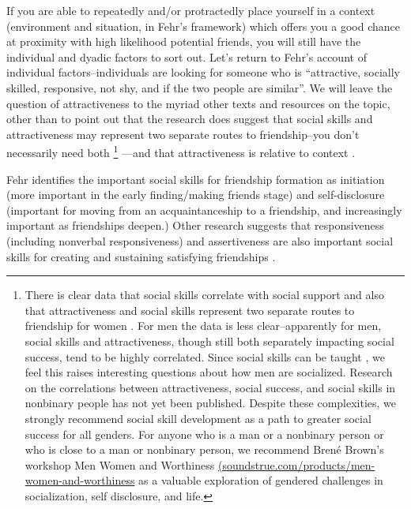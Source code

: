 \documentclass[12pt,letterpaper]{book}
\begin{document}
If you are able to repeatedly and/or protractedly place yourself in a context (environment and situation, in Fehr's framework) which offers you a good chance at proximity with high likelihood potential friends, you will still have the individual and dyadic factors to sort out. Let's return to Fehr's account of individual factors–individuals are looking for someone who is “attractive, socially skilled, responsive, not shy, and if the two people are similar”. We will leave the question of attractiveness to the myriad other texts and resources on the topic, other than to point out that the research does suggest that social skills and attractiveness may represent two separate routes to friendship–you don't necessarily need both \footnote{There is clear data that social skills correlate with social support \cite{sarason1985concomitants} and also that attractiveness and social skills represent two separate routes to friendship for women \cite{reis1982physical}. For men the data is less clear–apparently for men, social skills and attractiveness, though still both separately impacting social success, tend to be highly correlated. Since social skills can be taught \cite{brigman1999teaching,sazak2013outcomes}, we feel this raises interesting questions about how men are socialized. Research on the correlations between attractiveness, social success, and social skills in nonbinary people has not yet been published. Despite these complexities, we strongly recommend social skill development as a path to greater social success for all genders. For anyone who is a man or a nonbinary person or who is close to a man or nonbinary person, we recommend Bren{\'e} Brown's workshop Men Women and Worthiness \href{soundstrue.com/products/men-women-and-worthiness}{(soundstrue.com/products/men-women-and-worthiness} as a valuable exploration of gendered challenges in socialization, self disclosure, and life.} —and that attractiveness is relative to context \cite{geiselman1984context,melamed1975effect,little2011facial,moss1975effects,lei2020contrast}.
 
Fehr identifies the important social skills for friendship formation as initiation (more important in the early finding/making friends stage) and self-disclosure (important for moving from an acquaintanceship to a friendship, and increasingly important as friendships deepen.) Other research suggests that responsiveness (including nonverbal responsiveness) and assertiveness are also important social skills for creating and sustaining satisfying friendships \cite{riggio1986assessment}.
\end{document}
